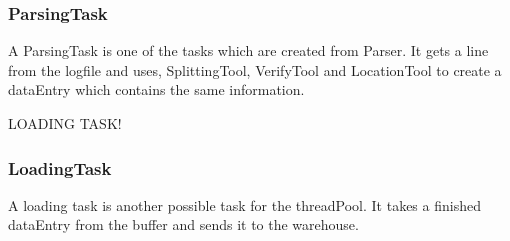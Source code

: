 \subsubsection*{ParsingTask}
A ParsingTask is one of the tasks which are created from Parser. It gets a line from the logfile and uses, SplittingTool, VerifyTool
and LocationTool to create a dataEntry which contains the same information. 

LOADING TASK!

\subsubsection*{LoadingTask}
A loading task is another possible task for the threadPool. It takes a finished dataEntry from the buffer and sends it to the warehouse.
